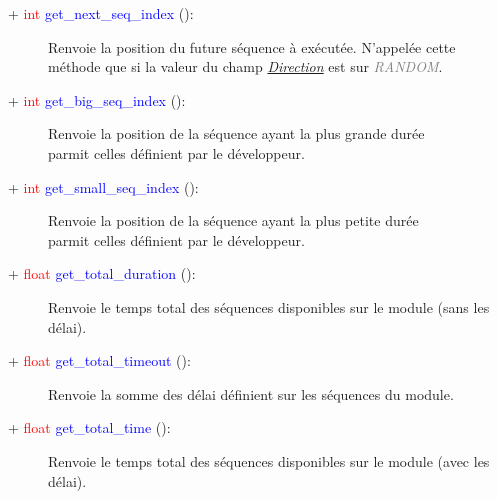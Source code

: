 \documentclass[a4paper, 11pt]{article}
\begin{document}
	\begin{description}
		\item [+ \textcolor{red}{int} \textcolor{blue}{get\_next\_seq\_index} ():] Renvoie la position du
		future séquence à exécutée. N'appelée cette méthode que si la valeur du champ
		\textit{\hyperlink{direction}{Direction}} est sur \textit{\textcolor{gray}{RANDOM}}.\\
	\end{description}
	\begin{description}
		\item [+ \textcolor{red}{int} \textcolor{blue}{get\_big\_seq\_index} ():] Renvoie la position de
		la séquence ayant la plus grande durée \\parmit celles définient par le développeur.\\
	\end{description}
	\begin{description}
		\item [+ \textcolor{red}{int} \textcolor{blue}{get\_small\_seq\_index} ():] Renvoie la position de 
		la séquence ayant la plus petite durée \\parmit celles définient par le développeur.\\
	\end{description}
	\begin{description}
		\item [+ \textcolor{red}{float} \textcolor{blue}{get\_total\_duration} ():] Renvoie le temps total
		des séquences disponibles sur le module (sans les délai).\\
	\end{description}
	\begin{description}
		\item [+ \textcolor{red}{float} \textcolor{blue}{get\_total\_timeout} ():] Renvoie la somme des 
		délai définient sur les séquences du module.\\
	\end{description}
	\begin{description}
		\item [+ \textcolor{red}{float} \textcolor{blue}{get\_total\_time} ():] Renvoie le temps total
		des séquences disponibles sur le module (avec les délai).\\
	\end{description}
\end{document}
